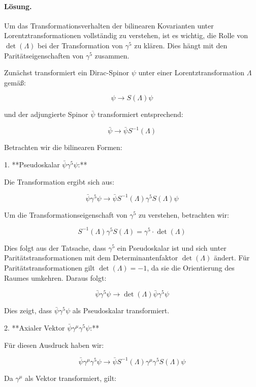 \documentclass[11pt,a4paper]{article}
\begin{document}
\paragraph{Lösung.}
Um das Transformationsverhalten der bilinearen Kovarianten unter Lorentztransformationen vollständig zu verstehen, ist es wichtig, die Rolle von \(\operatorname{det}(\Lambda)\) bei der Transformation von \(\gamma^5\) zu klären. Dies hängt mit den Paritätseigenschaften von \(\gamma^5\) zusammen.

Zunächst transformiert ein Dirac-Spinor \(\psi\) unter einer Lorentztransformation \(\Lambda\) gemäß:

\[
\psi \rightarrow S(\Lambda) \psi
\]

und der adjungierte Spinor \(\bar{\psi}\) transformiert entsprechend:

\[
\bar{\psi} \rightarrow \bar{\psi} S^{-1}(\Lambda)
\]

Betrachten wir die bilinearen Formen:

1. **Pseudoskalar \(\bar{\psi} \gamma^5 \psi\):**

Die Transformation ergibt sich aus:

\[
\bar{\psi} \gamma^5 \psi \rightarrow \bar{\psi} S^{-1}(\Lambda) \gamma^5 S(\Lambda) \psi
\]

Um die Transformationseigenschaft von \(\gamma^5\) zu verstehen, betrachten wir:

\[
S^{-1}(\Lambda) \gamma^5 S(\Lambda) = \gamma^5 \cdot \operatorname{det}(\Lambda)
\]

Dies folgt aus der Tatsache, dass \(\gamma^5\) ein Pseudoskalar ist und sich unter Paritätstransformationen mit dem Determinantenfaktor \(\operatorname{det}(\Lambda)\) ändert. Für Paritätstransformationen gilt \(\operatorname{det}(\Lambda) = -1\), da sie die Orientierung des Raumes umkehren. Daraus folgt:

\[
\bar{\psi} \gamma^5 \psi \rightarrow \operatorname{det}(\Lambda) \bar{\psi} \gamma^5 \psi
\]

Dies zeigt, dass \(\bar{\psi} \gamma^5 \psi\) als Pseudoskalar transformiert.

2. **Axialer Vektor \(\bar{\psi} \gamma^\mu \gamma^5 \psi\):**

Für diesen Ausdruck haben wir:

\[
\bar{\psi} \gamma^\mu \gamma^5 \psi \rightarrow \bar{\psi} S^{-1}(\Lambda) \gamma^\mu \gamma^5 S(\Lambda) \psi
\]

Da \(\gamma^\mu\) als Vektor transformiert, gilt:
\end{document}
